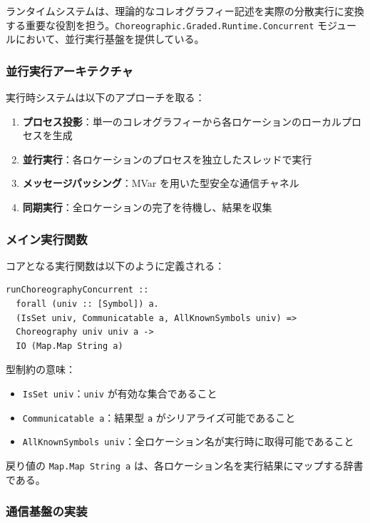 ランタイムシステムは、理論的なコレオグラフィー記述を実際の分散実行に変換する重要な役割を担う。\texttt{Choreographic.Graded.Runtime.Concurrent} モジュールにおいて、並行実行基盤を提供している。

\subsubsection{並行実行アーキテクチャ}

実行時システムは以下のアプローチを取る：
\begin{enumerate}
\item \textbf{プロセス投影}：単一のコレオグラフィーから各ロケーションのローカルプロセスを生成
\item \textbf{並行実行}：各ロケーションのプロセスを独立したスレッドで実行
\item \textbf{メッセージパッシング}：MVar を用いた型安全な通信チャネル
\item \textbf{同期実行}：全ロケーションの完了を待機し、結果を収集
\end{enumerate}

\subsubsection{メイン実行関数}

コアとなる実行関数は以下のように定義される：

\begin{verbatim}
runChoreographyConcurrent ::
  forall (univ :: [Symbol]) a.
  (IsSet univ, Communicatable a, AllKnownSymbols univ) =>
  Choreography univ univ a ->
  IO (Map.Map String a)
\end{verbatim}

型制約の意味：
\begin{itemize}
\item \texttt{IsSet univ}：\texttt{univ} が有効な集合であること
\item \texttt{Communicatable a}：結果型 \texttt{a} がシリアライズ可能であること
\item \texttt{AllKnownSymbols univ}：全ロケーション名が実行時に取得可能であること
\end{itemize}

戻り値の \texttt{Map.Map String a} は、各ロケーション名を実行結果にマップする辞書である。

\subsubsection{通信基盤の実装}

